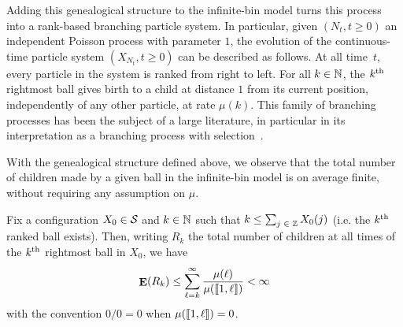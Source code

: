 \documentclass[AHL,Unicode,longabstracts,published]{cedram}
\DeclareMathOperator{\E}{\mathbf{E}}
\newcommand{\bbN}{\mathbb{N}}
\newcommand{\Z}{\mathbb{Z}}
\renewcommand{\S}{\mathcal{S}}
\let\oldin\in
\renewcommand{\in}{\mathchoice{\oldin}{\oldin}{\,\oldin\,}{\,\oldin\,}}
\newcommand{\llbracket}{\mathopen{[\mkern -2.7mu[}}
\newcommand{\rrbracket}{\mathclose{]\mkern -2.7mu]}}
\newcommand{\llb}{\llbracket}
\newcommand{\rrb}{\rrbracket}
\newcommand{\Z}{\mathbb{Z}}
\begin{document}
\begin{rema}\label{rem:genealogical}
Adding this genealogical structure to the infinite-bin model turns this process into a rank-based branching particle system. In particular, given ${(N_t, t \geq 0)}$ an independent Poisson process with parameter $1$, the evolution of the continuous-time particle system $(X_{N_t}, t \geq 0)$ can be described as follows. At all time~$t$, every particle in the system is ranked from right to left. For all $k \in \bbN$, the $k^{\rm th}$ rightmost ball gives birth to a child at distance $1$ from its current position, independently of any other particle, at rate $\mu(k)$. This family of branching processes has been the subject of a large literature, in particular in its interpretation as a branching process with selection~\cite{BrunetDerrida,BerardGouere,Maillard,Tourniaire}.
\end{rema}

With the genealogical structure defined above, we observe that the total number of children made by a given ball in the infinite-bin model is on average finite, without requiring any assumption on $\mu$.

\pagebreak
\begin{lemm}\label{lem:finiteOffspring}
Fix a configuration $X_0 \in \S$ and $k\in \bbN$ such that $k \leq \sum_{j \in \Z} X_0(j)$ (i.e. the $k^{\rm th}$ ranked ball exists). Then, writing $R_k$ the total number of children at all times of the $k^{\rm th}$ rightmost ball in $X_0$, we have
\[
\E(R_k) \leq \sum_{\ell=k}^\infty \frac{\mu(\ell)}{\mu(\llb 1,\ell\rrb )} < \infty
\]
with the convention $0/0 = 0$ when $\mu(\llb 1,\ell\rrb ) = 0$.
\end{lemm}
\end{document}

